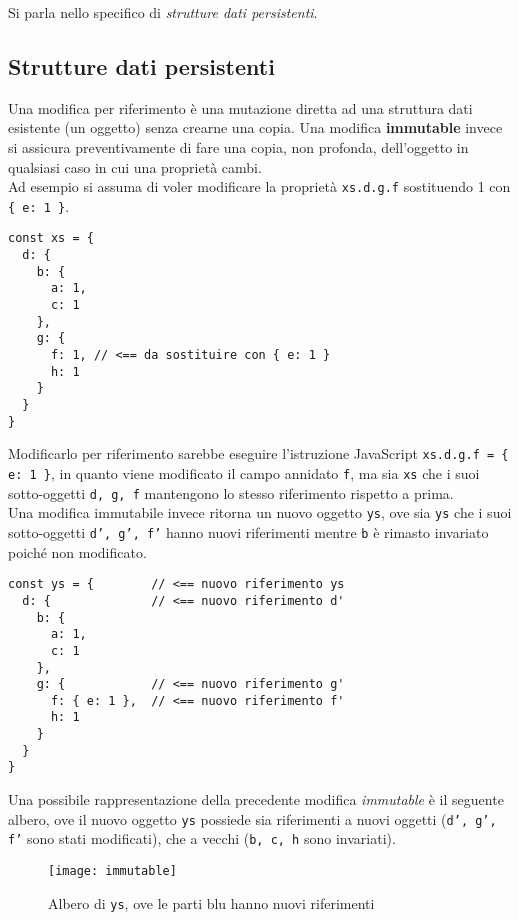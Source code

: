 Si parla nello specifico di \textit{strutture dati persistenti}.

\subsection{Strutture dati persistenti}

Una modifica per riferimento è una mutazione diretta ad una struttura dati esistente (un oggetto) senza crearne una copia. Una modifica \textbf{immutable} invece si assicura preventivamente di fare una copia, non profonda, dell'oggetto in qualsiasi caso in cui una proprietà cambi. \\

Ad esempio si assuma di voler modificare la proprietà \texttt{xs.d.g.f} sostituendo 1 con \texttt{\{ e: 1 \}}. 

\begin{lstlisting}[language={[Sharp]C},basicstyle=\footnotesize]
const xs = {
  d: {
    b: {
      a: 1,
      c: 1
    },
    g: {
      f: 1, // <== da sostituire con { e: 1 }
      h: 1
    }
  }
}
\end{lstlisting}

Modificarlo per riferimento sarebbe eseguire l'istruzione JavaScript \texttt{xs.d.g.f = \{ e: 1 \}}, in quanto viene modificato il campo annidato \texttt{f}, ma sia \texttt{xs} che i suoi sotto-oggetti \texttt{d, g, f} mantengono lo stesso riferimento rispetto a prima. \\

Una modifica immutabile invece ritorna un nuovo oggetto \texttt{ys}, ove sia \texttt{ys} che i suoi sotto-oggetti \texttt{d', g', f'} hanno nuovi riferimenti mentre \texttt{b} è rimasto invariato poiché non modificato.

\begin{lstlisting}[language={[Sharp]C},basicstyle=\footnotesize]
const ys = {        // <== nuovo riferimento ys
  d: {              // <== nuovo riferimento d'
    b: {
      a: 1,
      c: 1
    },
    g: {            // <== nuovo riferimento g'
      f: { e: 1 },  // <== nuovo riferimento f'
      h: 1
    }
  }
}
\end{lstlisting}

Una possibile rappresentazione della precedente modifica \textit{immutable} è il seguente albero, ove il nuovo oggetto \texttt{ys} possiede sia riferimenti a nuovi oggetti (\texttt{d', g', f'} sono stati modificati), che a vecchi (\texttt{b, c, h} sono invariati).

\begin{figure}[H] 
  \centering 
  \texttt{[image: immutable]} 
  \caption{Albero di \texttt{ys}, ove le parti blu hanno nuovi riferimenti}
\end{figure}

